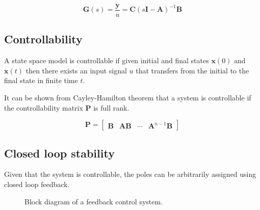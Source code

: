 \documentclass{article}
\begin{document}
\begin{equation} 
  \mathbf{G}(s) = \frac{\mathbf{y}}{u} = \mathbf{C} (s\mathbf{I} - \mathbf{A}) ^{-1} \mathbf{B}
\end{equation}

\subsection{Controllability}


A state space model is controllable if given initial and final states $\mathbf{x}(0)$ and $\mathbf{x}(t)$
then there exists an input signal $u$ that transfers from the initial to the final state in finite time $t$.

It can be shown from Cayley-Hamilton theorem that a system is controllable if the controllability matrix $\mathbf{P}$ is full rank.

\begin{equation}
  \mathbf{P} = \begin{bmatrix}
    \mathbf{B} & \mathbf{AB} & \cdots & \mathbf{A}^{n-1}\mathbf{B}
  \end{bmatrix}
  \label{eq:controllability_matrix}
\end{equation}

\subsection{Closed loop stability}
Given that the system is controllable, the poles can be arbitrarily assigned using closed loop feedback.

\begin{figure}[H]
  \centering
  \caption{Block diagram of a feedback control system.}
  \label{fig:feedback_control_system}
\end{figure}
\end{document}
